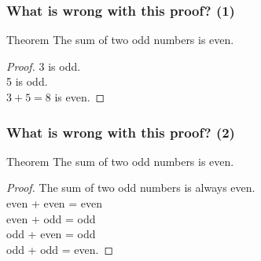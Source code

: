 \documentclass[14pt]{beamer}
\begin{document}
\begin{frame}
\frametitle{What is wrong with this proof? (1)}

\begin{block}{Theorem}
The sum of two odd numbers is even.
\end{block}
 
	\vfill

\begin{proof}
3 is odd.  \\
5 is odd. \\
$3+5 = 8$ is even.
\end{proof}

\vfill

\end{frame}
\begin{frame}
\frametitle{What is wrong with this proof? (2)}


\begin{block}{Theorem}
The sum of two odd numbers is even.
\end{block}

 \vfill

\begin{proof}
The sum of two odd numbers is always even.  \\
even + even = even \\
even + odd = odd \\
odd + even = odd \\
odd + odd = even.
\end{proof}

\vfill

\end{frame}
%
%
%
%
%
%
%
\end{document}
